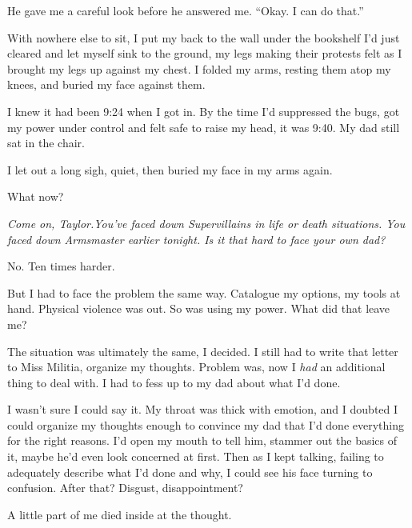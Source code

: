He gave me a careful look before he answered me.  ``Okay.  I can do that.''



With nowhere else to sit, I put my back to the wall under the bookshelf I'd just cleared and let myself sink to the ground, my legs making their protests felt as I brought my legs up against my chest.  I folded my arms, resting them atop my knees, and buried my face against them.



I knew it had been 9:24 when I got in.  By the time I'd suppressed the bugs, got my power under control and felt safe to raise my head, it was 9:40.  My dad still sat in the chair.



I let out a long sigh, quiet, then buried my face in my arms again.



What now?



\emph{Come on, Taylor.}\emph{You've faced down Supervillains in life or death situations.  You faced down Armsmaster earlier tonight.  Is it that hard to face your own dad?}



No.  Ten times harder.



But I had to face the problem the same way.  Catalogue my options, my tools at hand.  Physical violence was out.  So was using my power.  What did that leave me?



The situation was ultimately the same, I decided.  I still had to write that letter to Miss Militia, organize my thoughts.  Problem was, now I \emph{had }an additional thing to deal with.  I had to fess up to my dad about what I'd done.



I wasn't sure I could say it.  My throat was thick with emotion, and I doubted I could organize my thoughts enough to convince my dad that I'd done everything for the right reasons.  I'd open my mouth to tell him, stammer out the basics of it, maybe he'd even look concerned at first.  Then as I kept talking, failing to adequately describe what I'd done and why, I could see his face turning to confusion.  After that?  Disgust, disappointment?



A little part of me died inside at the thought.




